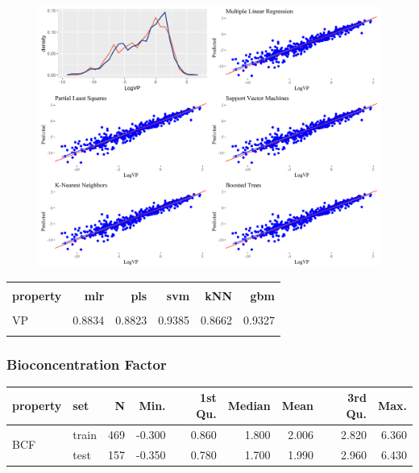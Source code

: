 \documentclass[10pt, letter]{article}
\renewcommand{\=}{\, =\, }
\newcommand{\+}{\, +\, }
\renewcommand{\-}{\, -\, }
\begin{document}
\begin{figure}[H]
  \centering
    \includegraphics[width=1.0\textwidth]{VP_plots.png}
\end{figure}

\begin{table}[H]
\begin{center}
\begin{tabular}{lrrrrr}
\toprule
&&\\
{\bf property} & {\bf mlr} & {\bf pls} &  {\bf svm}  & {\bf kNN}  & {\bf gbm}\\
\midrule
&&\\
VP  &   0.8834 & 0.8823 & 0.9385 & 0.8662 & 0.9327\\
&&\\
\midrule
\hline
\end{tabular}
\end{center}
\end{table}

\subsubsection{Bioconcentration Factor}

\begin{table}[H]
\begin{center}
\begin{tabular}{llrrrrrrr}
\toprule
{\bf property} & {\bf set} & {\bf N} & {\bf Min.} & {\bf 1st Qu.} &  {\bf Median}  & {\bf Mean}  & {\bf 3rd Qu.} & {\bf Max.}\\
\midrule
\multirow{2}{15mm}{BCF}
& train &  469 & -0.300 & 0.860 & 1.800 & 2.006 & 2.820 & 6.360\\
& test &  157 & -0.350 & 0.780 & 1.700 & 1.990 & 2.960 & 6.430\\
\midrule
\hline
\end{tabular}
\end{center}
\end{table}
\end{document}
